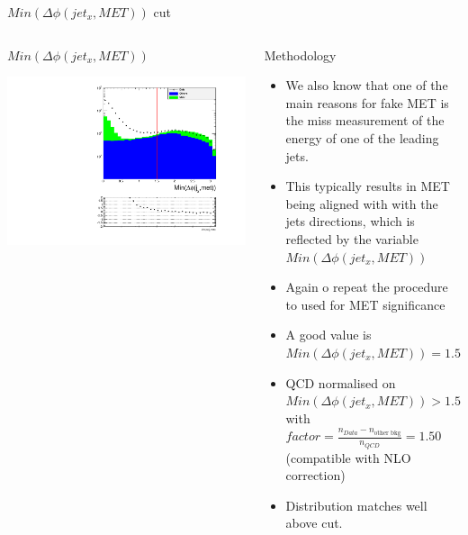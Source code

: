 \documentclass[8pt]{beamer}
\begin{document}
\begin{frame}{$Min(\Delta\phi(jet_{x},MET))$ cut}

\begin{columns}
 
\begin{block}{$Min(\Delta\phi(jet_{x},MET))$}
 
\includegraphics[width=\linewidth]{img/DEta3p6_MetSig3p0/jetmet_mindphi_LogY.pdf}

\end{block}

\begin{block}{Methodology}
 
\begin{itemize}
  \item We also know that one of the main reasons for fake MET is the miss measurement of the energy of one of the leading jets. 
  \item This typically results in MET being aligned with with the jets directions, which is reflected by the variable $Min(\Delta\phi(jet_{x},MET))$
  \item Again o repeat the procedure to used for MET significance 
  \item A good value is $Min(\Delta\phi(jet_{x},MET))=1.5$
  \item QCD normalised on $Min(\Delta\phi(jet_{x},MET))>1.5$ with $factor = \frac{n_{Data}-n_{\text{other bkg}}}{n_{QCD}}=1.50$ (compatible with NLO correction)
  \item Distribution matches well above cut.
\end{itemize}
 
\end{block}

\end{columns}

\end{frame}
\end{document}
